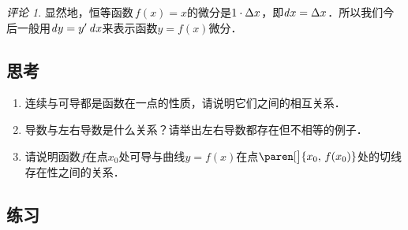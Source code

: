 \documentclass[a4paper,punct=CCT]{ctexbook}
\theoremstyle{definition}
\theoremstyle{remark}
\newtheorem*{remark}{评论}
\newif\ifshowex
\newif\ifshowsolp
\begin{document}
\begin{remark}
  显然地，恒等函数\(\,f(x) = x\)的微分是\(1 \cdot \mathop{}\!\Delta x\)，即\(\mathop{}\!\mathit{d} x = \mathop{}\!\Delta x\)．所以我们今后一般用\(\mathop{}\!\mathit{d} y = y' \mathop{}\!\mathit{d} x\)来表示函数\(y = f(x)\)微分．
\end{remark}


\subsection*{思考}

\begin{enumerate}
\item 连续与可导都是函数在一点的性质，请说明它们之间的相互关系．

  \ifshowsolp
  可导一定连续，连续未必可导（定理~\ref{thm:deriv2cont}）．
  \fi

\item 导数与左右导数是什么关系？请举出左右导数都存在但不相等的例子．

  \ifshowsolp
  见定理~\ref{thm:derivsided}．一个简单的例子就是绝对值函数\(\abs x\)．
  \fi

\item 请说明函数\(f\)在点\(x_0\)处可导与曲线\(y = f(x)\)在点\(\paren[\big]{x_0, \,f(x_0)}\)处的切线存在性之间的关系．

  \ifshowsolp
  可导则切线一定存在，切线存在未必可导．例如函数\(\!\sqrt[\leftroot{-2}\uproot{2}3] x\)在原点处的切线存在但不可导．
  \fi
\end{enumerate}

\ifshowex
{}
\subsection*{练习}
\label{B1.4.1.E}
\end{document}
